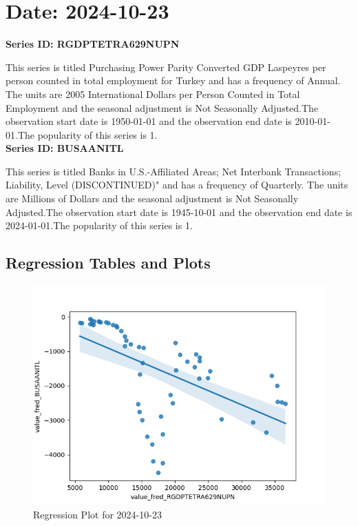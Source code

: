 \section{Date: 2024-10-23}
\noindent \textbf{Series ID: RGDPTETRA629NUPN} 

\noindent This series is titled Purchasing Power Parity Converted GDP Laspeyres per person counted in total employment for Turkey and has a frequency of Annual. The units are 2005 International Dollars per Person Counted in Total Employment and the seasonal adjustment is Not Seasonally Adjusted.The observation start date is 1950-01-01 and the observation end date is 2010-01-01.The popularity of this series is 1. \\ 

\noindent \textbf{Series ID: BUSAANITL} 

\noindent This series is titled Banks in U.S.-Affiliated Areas; Net Interbank Transactions; Liability, Level (DISCONTINUED)" and has a frequency of Quarterly. The units are Millions of Dollars and the seasonal adjustment is Not Seasonally Adjusted.The observation start date is 1945-10-01 and the observation end date is 2024-01-01.The popularity of this series is 1. \\ 

\subsection{Regression Tables and Plots}


\begin{figure}
\centering
\includegraphics[scale = 0.9]{plots/plot_2024-10-23.png}
\caption{Regression Plot for 2024-10-23}
\end{figure}
\newpage
